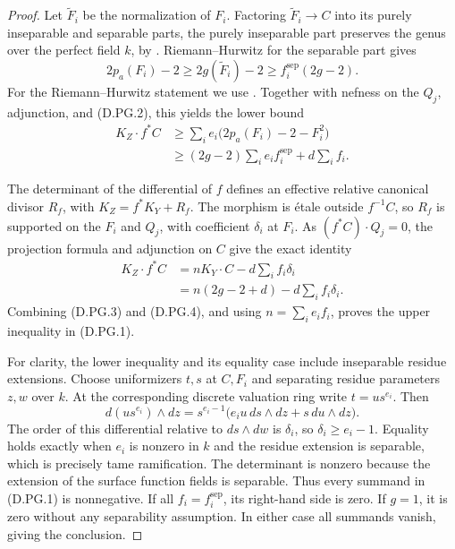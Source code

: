 \begin{proof}
Let $\widetilde F_i$ be the normalization of $F_i$.
Factoring $\widetilde F_i\to C$ into its purely inseparable
and separable parts, the purely inseparable part preserves the
genus over the perfect field $k$, by
\cite[Proposition 53.13.7 and Lemma 53.13.5, Tags 0CD2 and 0CD0]{StacksDSurfaceResolution}.
Riemann--Hurwitz for the
separable part gives
\[
 2p_a(F_i)-2\geq 2g(\widetilde F_i)-2
                   \geq f_i^{\mathrm{sep}}(2g-2).
\]
For the Riemann--Hurwitz statement we use
\cite[Lemma 53.12.2, Tag 0C1D]{StacksDSurfaceResolution}.
Together with nefness on the $Q_j$, adjunction, and (D.PG.2),
this yields the lower bound
\[
 \begin{split}
 K_Z\cdot f^*C
 &\geq\sum_i e_i\bigl(2p_a(F_i)-2-F_i^2\bigr)\\
 &\geq(2g-2)\sum_i e_i f_i^{\mathrm{sep}}+d\sum_i f_i.
 \end{split}
 \tag{D.PG.3}
\]

The determinant of the differential of $f$ defines an effective
relative canonical divisor $R_f$, with
$K_Z=f^*K_Y+R_f$. The morphism is \'etale outside $f^{-1}C$,
so $R_f$ is supported on the $F_i$ and $Q_j$, with coefficient
$\delta_i$ at $F_i$. As $(f^*C)\cdot Q_j=0$, the projection
formula and adjunction on $C$ give the exact identity
\[
 \begin{split}
 K_Z\cdot f^*C
  &= nK_Y\cdot C-d\sum_i f_i\delta_i\\
  &= n(2g-2+d)-d\sum_i f_i\delta_i.
 \end{split}
 \tag{D.PG.4}
\]
Combining (D.PG.3) and (D.PG.4), and using
$n=\sum_i e_i f_i$, proves the upper inequality in (D.PG.1).

For clarity, the lower inequality and its equality case include
inseparable residue extensions. Choose uniformizers $t,s$ at
$C,F_i$ and separating residue parameters $z,w$ over $k$.
At the corresponding discrete valuation ring write $t=u s^{e_i}$.
Then
\[
 d(us^{e_i})\wedge dz
   =s^{e_i-1}\bigl(e_i u\,ds\wedge dz+s\,du\wedge dz\bigr).
\]
The order of this differential relative to $ds\wedge dw$ is
$\delta_i$, so $\delta_i\geq e_i-1$. Equality holds exactly
when $e_i$ is nonzero in $k$ and the residue extension is
separable, which is precisely tame ramification. The determinant
is nonzero because the extension of the surface function fields
is separable. Thus every summand in (D.PG.1) is nonnegative.
If all $f_i=f_i^{\mathrm{sep}}$, its right-hand side is zero.
If $g=1$, it is zero without any separability assumption.
In either case all summands vanish, giving the conclusion.
\end{proof}

